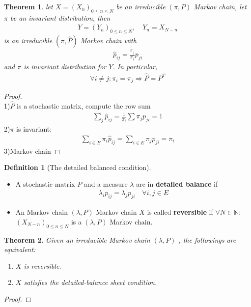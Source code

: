 \documentclass[a4paper,11pt]{book}
\newtheorem{theorem}{Theorem}[section]
\theoremstyle{definition}
\newtheorem{definition}{Definition}[section]
\theoremstyle{remark}
\begin{document}
\begin{theorem}
	let $X = (X_n)_{0 \le n \le N}$ be an irreducible $(\pi,P)$ Markov chain, let $\pi$ be an invariant distribution, then
	\begin{align*}
		Y = (Y_n)_{0 \le n \le N},\quad Y_n = X_{N - n}
	\end{align*}
	is an irreducible $(\pi, \hat{P})$ Markov chain with
	\begin{align*}
		\hat{p}_{ij} = \frac{\pi_j}{\pi_i} p_{ji}
	\end{align*}
	and $\pi$ is invariant distribution for $Y$. In particular, 
	\begin{align*}
		\forall i \neq j : \pi_i = \pi_j \Rightarrow \hat{P} = P^T
	\end{align*}
\end{theorem}
\begin{proof}\quad\\
	1)$\hat{P}$ is a stochastic matrix, compute the row sum
	\begin{align*}
		\sum_j \hat{p}_{ij} = \frac{1}{\pi_i} \sum \pi_j p_{ji} = 1
	\end{align*}
	2)$\pi$ is invariant:
	\begin{align*}
		\sum_{i \in E} \pi_i \hat{p}_{ij} = \sum_{i \in E}\pi_jp_{ji} = \pi_i
	\end{align*}
	3)Markov chain
\end{proof}

\begin{definition}[The detailed balanced condition]\quad
	\begin{itemize}
		\item A stochastic matrix $P$ and a measure $\lambda$ are in \textbf{detailed balance} if
		\begin{align*}
			\lambda_i p_{ij} = \lambda_j p_{ji} \quad \forall i, j \in E
		\end{align*}
		\item An Markov chain $(\lambda, P)$ Markov chain $X$ is called \textbf{reversible }if $\forall N \in \mathbb{N}:$ $(X_{N-n})_{0 \le n \le N}$ is a $(\lambda, P)$ Markov chain.
	\end{itemize}
\end{definition}


\begin{theorem}
	Given an irreducible Markov chain $(\lambda, P)$ , the followings are equivalent:
	\begin{enumerate}
		\item $X$ is reversible.
		\item $X$ satisfies the detailed-balance sheet condition.
	\end{enumerate}
\end{theorem}
\begin{proof}
	
\end{proof}
\end{document}
